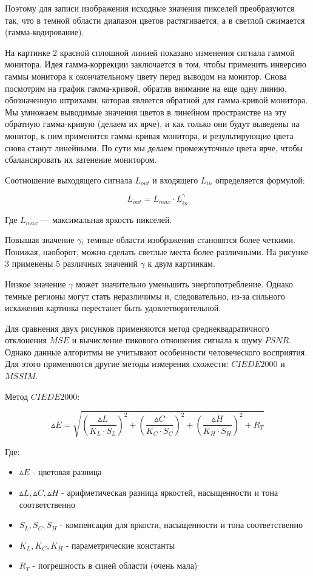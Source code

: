 \documentclass[a4paper, 12pt]{article}
\begin{document}
	Поэтому для записи изображения исходные значения пикселей преобразуются так, что в темной области диапазон цветов растягивается, а в светлой сжимается (гамма-кодирование).
	
	На картинке 2 красной сплошной линией показано изменения сигнала гаммой монитора. Идея гамма-коррекции заключается в том, чтобы применить инверсию гаммы монитора к окончательному цвету перед выводом на монитор. Снова посмотрим на график гамма-кривой, обратив внимание на еще одну линию, обозначенную штрихами, которая является обратной для гамма-кривой монитора. Мы умножаем выводимые значения цветов в линейном пространстве на эту обратную гамма-кривую (делаем их ярче), и как только они будут выведены на монитор, к ним применится гамма-кривая монитора, и результирующие цвета снова станут линейными. По сути мы делаем промежуточные цвета ярче, чтобы сбалансировать их затенение монитором.

	Соотношение выходящего сигнала $L_{out}$ и входящего $L_{in}$  определяется формулой:
	
	\[L_{out} = L_{max}\cdot L_{in}^{\gamma}\]
	
	Где $L_{max}$ — максимальная яркость пикселей.
	
	Повышая значение $\gamma$, темные области изображения становятся более четкими. Понижая, наоборот, можно сделать светлые места более различными. На рисунке 3 применены 5 различных значений $\gamma$ к двум картинкам.
	
	Низкое значение $\gamma$ может значительно уменьшить энергопотребление. Однако темные регионы могут стать неразличимы и, следовательно, из-за сильного искажения картинка перестанет быть удовлетворительной. 
	
	Для сравнения двух рисунков применяются метод среднеквадратичного отклонения $MSE$ и вычисление пикового отношения сигнала к шуму $PSNR$. Однако данные алгоритмы не учитывают особенности человеческого восприятия. Для этого применяются другие методы измерения схожести: $CIEDE2000$ и $MSSIM$.
	
	Метод $CIEDE2000$:
	
	\[\vartriangle E=\sqrt{\left(\frac{\vartriangle L}{K_L\cdot S_L}\right)^2 + \left(\frac{\vartriangle C}{K_C\cdot S_C}\right)^2 + \left(\frac{\vartriangle H}{K_H\cdot S_H}\right)^2 + R_T}\]
	
	Где:
	\begin{itemize}
		\item $\vartriangle{E}$ - цветовая разница
		\item $\vartriangle L, \vartriangle C, \vartriangle H$ - арифметическая разница яркостей, насыщенности и тона соответственно
		\item $S_L, S_C, S_H$ - компенсация для  яркости, насыщенности и тона соответственно
		\item $K_L, K_C, K_H$ - параметрические константы
		\item $R_T$ - погрешность в синей области (очень мала)
	\end{itemize}
	
\end{document}
